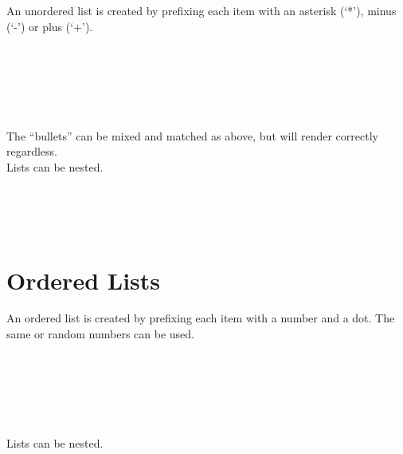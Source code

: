 An unordered list is created by prefixing each item with an asterisk (`*'), minus (`-') or plus (`+').\\

\noindent{}\\
\\
\\
\\
\\
\\

The ``bullets'' can be mixed and matched as above, but will render correctly regardless.\\

Lists can be nested.\\

\noindent{}\\
\\

\hspace{\parindent}

\hspace{\parindent}

\noindent{}\\

\section{Ordered Lists}
An ordered list is created by prefixing each item with a number and a dot. The same or random numbers can be used.\\

\noindent{}\\
\\
\\
\\
\\
\\

Lists can be nested.\\

\noindent{}\\
\\

\hspace{\parindent}

\hspace{\parindent}

